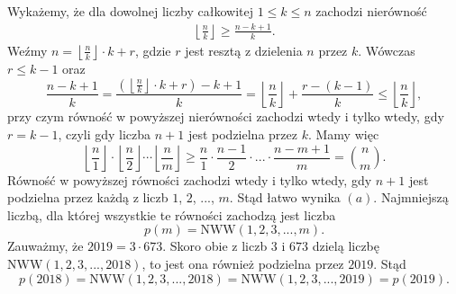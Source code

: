 \noindent
Wykażemy, że dla dowolnej liczby całkowitej $1 \leqslant k \leqslant n$ zachodzi nierówność
\begin{align*}
	\left \lfloor \frac{n}{k} \right \rfloor \geqslant \frac{n - k + 1}{k}.
\end{align*}
Weźmy $n = \left \lfloor \frac{n}{k} \right \rfloor \cdot k + r$, gdzie $r$ jest resztą z dzielenia $n$ przez $k$. Wówczas $r \leqslant k - 1$ oraz 
\[
	\frac{n - k + 1}{k} = \frac{\left (\left \lfloor \frac{n}{k} \right \rfloor \cdot k + r\right ) - k + 1}{k} = \left \lfloor \frac{n}{k} \right \rfloor + \frac{r - (k - 1)}{k} \leqslant \left \lfloor \frac{n}{k} \right \rfloor,
\]
przy czym równość w powyższej nierówności zachodzi wtedy i tylko wtedy, gdy $r = k - 1$, czyli gdy liczba $n + 1$ jest podzielna przez $k$. Mamy więc
\[
\left \lfloor \frac{n}{1} \right \rfloor \cdot \left \lfloor \frac{n}{2} \right \rfloor \cdots \left \lfloor \frac{n}{m} \right \rfloor \geqslant \frac{n}{1} \cdot \frac{n - 1}{2} \cdot ... \cdot \frac{n - m + 1}{m} = {{n}\choose{m}}.
\]
Równość w powyższej równości zachodzi wtedy i tylko wtedy, gdy $n + 1$ jest podzielna przez każdą z liczb $1$, $2$, ..., $m$. Stąd łatwo wynika $(a)$. Najmniejszą liczbą, dla której wszystkie te równości zachodzą jest liczba
\[
	p(m) = \mathrm{NWW}(1, 2, 3, ..., m).
\]
Zauważmy, że $2019 = 3 \cdot 673$. Skoro obie z liczb $3$ i $673$  dzielą liczbę $\mathrm{NWW}(1, 2, 3, ..., 2018)$, to jest ona również podzielna przez $2019$. Stąd
\[
	p(2018) = \mathrm{NWW}(1, 2, 3, ..., 2018) = \mathrm{NWW}(1, 2, 3, ..., 2019) = p(2019). 
\]

